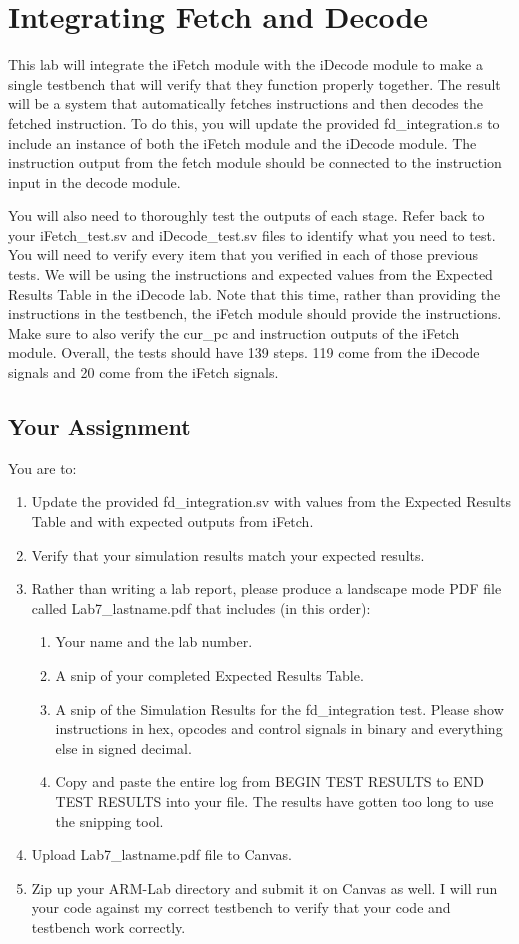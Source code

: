 \chapter{Integrating Fetch and Decode}

This lab will integrate the iFetch module with the iDecode module to make a single testbench that will verify that they function properly together.  The result will be a system that automatically fetches instructions and then decodes the fetched instruction.  To do this, you will update the provided fd\_integration.s to include an instance of both the iFetch module and the iDecode module.  The instruction output from the fetch module should be connected to the instruction input in the decode module.  

You will also need to thoroughly test the outputs of each stage.  Refer back to your iFetch\_test.sv and iDecode\_test.sv files to identify what you need to test.  You will need to verify every item that you verified in each of those previous tests.  We will be using the instructions and expected values from the Expected Results Table in the iDecode lab.  Note that this time, rather than providing the instructions in the testbench, the iFetch module should provide the instructions.  Make sure to also verify the cur\_pc and instruction outputs of the iFetch module.  Overall, the tests should have 139 steps.  119 come from the iDecode signals and 20 come from the iFetch signals.


\section{Your Assignment}

You are to:
\begin{enumerate}
\item Update the provided fd\_integration.sv with values from the Expected Results Table and with expected outputs from iFetch. 
\item Verify that your simulation results match your expected results.
\item Rather than writing a lab report, please produce a landscape mode PDF file called Lab7\_lastname.pdf that includes (in this order):
\begin{enumerate}
	\item Your name and the lab number.
	\item A snip of your completed Expected Results Table.
	\item A snip of the Simulation Results for the fd\_integration test.  Please show instructions in hex, opcodes and control signals in binary and everything else in signed decimal.  
	\item Copy and paste the entire log from BEGIN TEST RESULTS to END TEST RESULTS into your file.  The results have gotten too long to use the snipping tool.	
\end{enumerate}
\item Upload Lab7\_lastname.pdf file to Canvas.
\item Zip up your ARM-Lab directory and submit it on Canvas as well.  I will run your code against my correct testbench to verify that your code and testbench work correctly.
\end{enumerate} 
